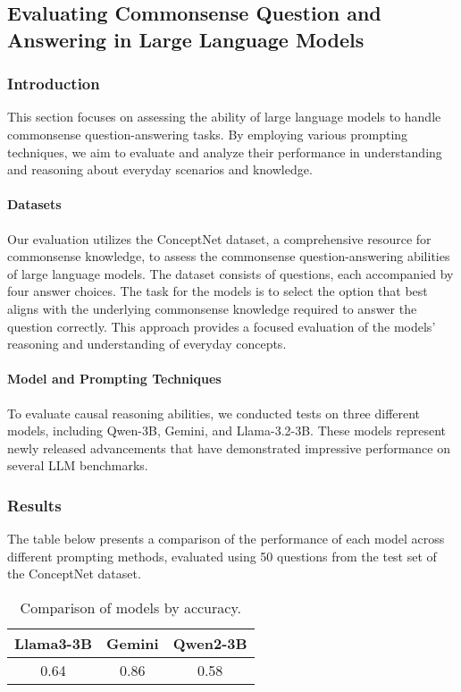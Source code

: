 \subsection{Evaluating Commonsense Question and Answering in Large Language Models}

\subsubsection{Introduction}
This section focuses on assessing the ability of large language models to handle commonsense question-answering tasks. By employing various prompting techniques, we aim to evaluate and analyze their performance in understanding and reasoning about everyday scenarios and knowledge.

\paragraph{Datasets}
Our evaluation utilizes the ConceptNet dataset, a comprehensive resource for commonsense knowledge, to assess the commonsense question-answering abilities of large language models. The dataset consists of questions, each accompanied by four answer choices. The task for the models is to select the option that best aligns with the underlying commonsense knowledge required to answer the question correctly. This approach provides a focused evaluation of the models' reasoning and understanding of everyday concepts.


\paragraph{Model and Prompting Techniques} 
To evaluate causal reasoning abilities, we conducted tests on three different models, including Qwen-3B, Gemini, and Llama-3.2-3B. These models represent newly released advancements that have demonstrated impressive performance on several LLM benchmarks.

\subsubsection{Results}
The table below presents a comparison of the performance of each model across different prompting methods, evaluated using 50 questions from the test set of the ConceptNet dataset.

\begin{table}[ht]
  \centering
  \begin{tabular}{|c|c|c|}
      \hline
      \textbf{Llama3-3B}    & \textbf{Gemini} & \textbf{Qwen2-3B} \\ \hline

        0.64 & 0.86 & 0.58\\ \hline 

  \end{tabular}
  \caption{Comparison of models by accuracy.}
  \label{tab:model_comparison}
\end{table}

